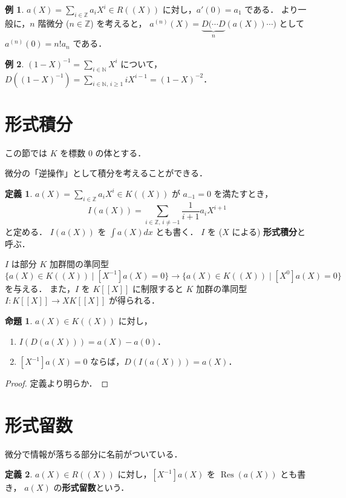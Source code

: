 \documentclass{jsarticle}
\DeclareMathOperator{\Res}{Res}
\newcommand{\N}{\mathbb{N}}
\newcommand{\Z}{\mathbb{Z}}
\newcommand{\longto}{\longrightarrow}
\theoremstyle{definition}
\newtheorem*{Dfn}{定義}
\newtheorem*{Exm}{例}
\newtheorem{Prp}{命題}
\newenvironment{dfn}{\vspace{1ex}\begin{screen}\begin{Dfn}}{\end{Dfn}\end{screen}\vspace{1ex}}
\newenvironment{exm}{\begin{leftbar}\begin{Exm}}{\end{Exm}\end{leftbar}}
\newenvironment{prp}{\vspace{1ex}\begin{screen}\begin{Prp}}{\end{Prp}\end{screen}}
\newenvironment{prf}{\begin{leftbar}\begin{proof}}{\end{proof}\end{leftbar}}
\begin{document}
\begin{exm}
  $a(X) = \sum_{i\in\Z} a_i X^i \in R((X))$ に対し，$a'(0) = a_1$ である．
  より一般に，$n$ 階微分 ($n \in \Z$) を考えると，
  $a^{(n)}(X) = \underbrace{D(\cdots D}_n (a(X)) \cdots)$ として $a^{(n)}(0) = n! a_n$ である．
\end{exm}

\begin{exm}
  $(1 - X)^{-1} = \sum_{i\in\N} X^i$ について，
  $D((1 - X)^{-1}) = \sum_{i\in\N,\,i\ge 1} i X^{i-1} = (1 - X)^{-2}$．
\end{exm}


\section{形式積分}
この節では $K$ を標数 $0$ の体とする．

微分の「逆操作」として積分を考えることができる．

\begin{dfn}
  $a(X) = \sum_{i\in\Z} a_i X^i \in K((X))$ が $a_{-1} = 0$ を満たすとき，
  \[
    I(a(X)) = \sum_{i\in\Z,\,i\ne -1} \frac{1}{i + 1} a_i X^{i+1}
  \]
  と定める．
  $I(a(X))$ を $\int a(X) dx$ とも書く．
  $I$ を ($X$ による) \textbf{形式積分}と呼ぶ．
\end{dfn}

$I$ は部分 $K$ 加群間の準同型
$\{ a(X) \in K((X)) \mid [X^{-1}] a(X) = 0 \} \longto \{ a(X) \in K((X)) \mid [X^0] a(X) = 0 \}$ を与える．
また，$I$ を $K[[X]]$ に制限すると
$K$ 加群の準同型 $I\colon K[[X]] \longto X K[[X]]$ が得られる．

\begin{prp}
  $a(X) \in K((X))$ に対し，
  \begin{enumerate}[(1)]
    \item $I(D(a(X))) = a(X) - a(0)$．
    \item $[X^{-1}] a(X) = 0$ ならば，$D(I(a(X))) = a(X)$．
  \end{enumerate}
\end{prp}
\begin{prf}
  定義より明らか．
\end{prf}

\section{形式留数}
微分で情報が落ちる部分に名前がついている．

\begin{dfn}
  $a(X) \in R((X))$ に対し，$[X^{-1}] a(X)$ を $\Res(a(X))$ とも書き，
  $a(X)$ の\textbf{形式留数}という．
\end{dfn}
\end{document}
